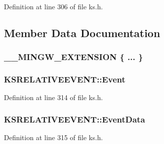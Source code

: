 Definition at line 306 of file ks.\+h.



\subsection{Member Data Documentation}
\subsubsection[{\texorpdfstring{"@181}{@181}}]{\setlength{\rightskip}{0pt plus 5cm}\+\_\+\+\_\+\+M\+I\+N\+G\+W\+\_\+\+E\+X\+T\+E\+N\+S\+I\+ON \{ ... \} }\hypertarget{struct_k_s_r_e_l_a_t_i_v_e_e_v_e_n_t_af8404ba585693842110f4363631fb5d0}{}\label{struct_k_s_r_e_l_a_t_i_v_e_e_v_e_n_t_af8404ba585693842110f4363631fb5d0}
\subsubsection[{\texorpdfstring{Event}{Event}}]{ K\+S\+R\+E\+L\+A\+T\+I\+V\+E\+E\+V\+E\+N\+T\+::\+Event}\hypertarget{struct_k_s_r_e_l_a_t_i_v_e_e_v_e_n_t_a832cb6010891364ea88339705304aeab}{}\label{struct_k_s_r_e_l_a_t_i_v_e_e_v_e_n_t_a832cb6010891364ea88339705304aeab}


Definition at line 314 of file ks.\+h.

\subsubsection[{\texorpdfstring{Event\+Data}{EventData}}]{ K\+S\+R\+E\+L\+A\+T\+I\+V\+E\+E\+V\+E\+N\+T\+::\+Event\+Data}\hypertarget{struct_k_s_r_e_l_a_t_i_v_e_e_v_e_n_t_aad34baa168c003862cc7ad87f41520a4}{}\label{struct_k_s_r_e_l_a_t_i_v_e_e_v_e_n_t_aad34baa168c003862cc7ad87f41520a4}


Definition at line 315 of file ks.\+h.

